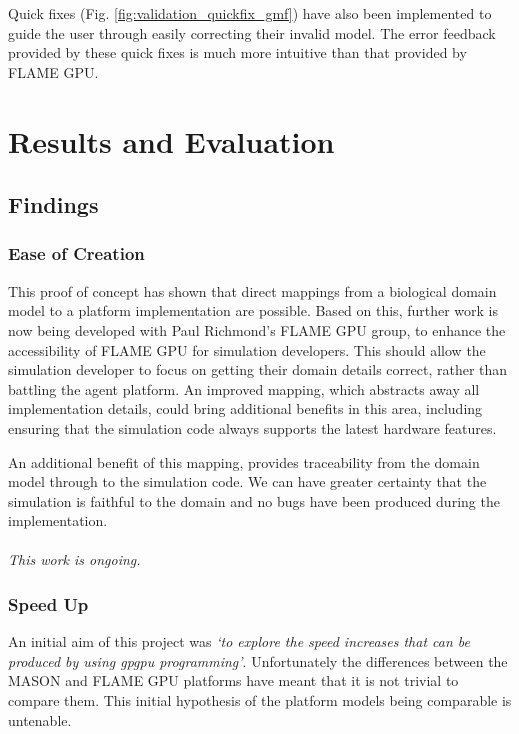 \documentclass{UoYCSproject}
\begin{document}
Quick fixes (Fig. \ref{fig:validation_quickfix_gmf}) have also been implemented to guide the user through easily correcting their invalid model.
The error feedback provided by these quick fixes is much more intuitive than that provided by \gls{FLAME GPU}.


\chapter{Results and Evaluation}
\label{results}


\section{Findings}
\subsection{Ease of Creation}
This proof of concept has shown that direct mappings from a biological domain model to a platform implementation are possible.
Based on this, further work is now being developed with Paul Richmond's \gls{FLAME GPU} group, to enhance the accessibility of \gls{FLAME GPU} for simulation developers.
This should allow the simulation developer to focus on getting their domain details correct, rather than battling the agent platform.
An improved mapping, which abstracts away all implementation details, could bring additional benefits in this area, including ensuring that the simulation code always supports the latest hardware features.


An additional benefit of this mapping, provides traceability from the domain model through to the simulation code.
We can have greater certainty that the simulation is faithful to the domain and no bugs have been produced during the implementation.
\\\\
\textit{This work is ongoing.}

\subsection{Speed Up}


An initial aim of this project was \textit{`to explore the speed increases that can be produced by using \gls{gpgpu} programming'}.
Unfortunately the differences between the \gls{MASON} and \gls{FLAME GPU} platforms have meant that it is not trivial to compare them.
This initial hypothesis of the platform models being comparable is untenable.
\end{document}
